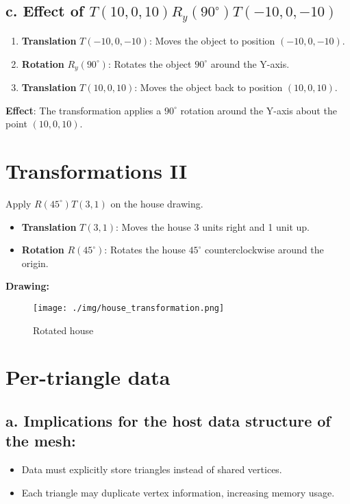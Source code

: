 \documentclass{article}
\begin{document}
\subsection{c. Effect of $T(10, 0, 10)R_y(90^\circ)T(-10, 0, -10)$}

\begin{enumerate}
    \item \textbf{Translation} $T(-10, 0, -10)$: Moves the object to position $(-10, 0, -10)$.
    \item \textbf{Rotation} $R_y(90^\circ)$: Rotates the object $90^\circ$ around the Y-axis.
    \item \textbf{Translation} $T(10, 0, 10)$: Moves the object back to position $(10, 0, 10)$.
\end{enumerate}
\textbf{Effect}: The transformation applies a $90^\circ$ rotation around the Y-axis about the point $(10, 0, 10)$.

\newpage
\section{Transformations II}

Apply $R(45^\circ)T(3, 1)$ on the house drawing.
\begin{itemize}
    \item \textbf{Translation} $T(3, 1)$: Moves the house 3 units right and 1 unit up.
    \item \textbf{Rotation} $ R(45^\circ) $: Rotates the house $45^\circ$ counterclockwise around the origin.
\end{itemize}

\textbf{Drawing:}

\begin{figure}[H]
    \centering
    \texttt{[image: ./img/house\_transformation.png]}
    \caption{Rotated house}
    \label{fig:house}
\end{figure}

\newpage
\section{Per-triangle data}

\subsection{a. Implications for the host data structure of the mesh:}
\begin{itemize}
    \item Data must explicitly store triangles instead of shared vertices.
    \item Each triangle may duplicate vertex information, increasing memory usage.
\end{itemize}
\end{document}
